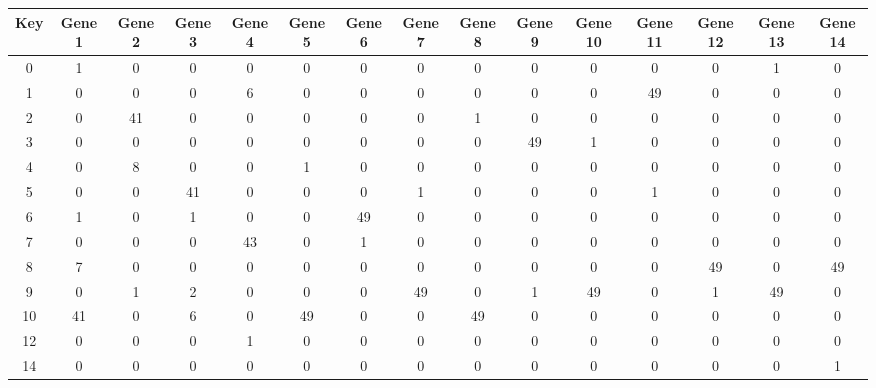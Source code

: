 \begin{tabular}{|c|c|c|c|c|c|c|c|c|c|c|c|c|c|c|}
\hline
Key & Gene 1 & Gene 2 & Gene 3 & Gene 4 & Gene 5 & Gene 6 & Gene 7 & Gene 8 & Gene 9 & Gene 10 & Gene 11 & Gene 12 & Gene 13 & Gene 14 \\
\hline
0 & 1 & 0 & 0 & 0 & 0 & 0 & 0 & 0 & 0 & 0 & 0 & 0 & 1 & 0 \\
1 & 0 & 0 & 0 & 6 & 0 & 0 & 0 & 0 & 0 & 0 & 49 & 0 & 0 & 0 \\
2 & 0 & 41 & 0 & 0 & 0 & 0 & 0 & 1 & 0 & 0 & 0 & 0 & 0 & 0 \\
3 & 0 & 0 & 0 & 0 & 0 & 0 & 0 & 0 & 49 & 1 & 0 & 0 & 0 & 0 \\
4 & 0 & 8 & 0 & 0 & 1 & 0 & 0 & 0 & 0 & 0 & 0 & 0 & 0 & 0 \\
5 & 0 & 0 & 41 & 0 & 0 & 0 & 1 & 0 & 0 & 0 & 1 & 0 & 0 & 0 \\
6 & 1 & 0 & 1 & 0 & 0 & 49 & 0 & 0 & 0 & 0 & 0 & 0 & 0 & 0 \\
7 & 0 & 0 & 0 & 43 & 0 & 1 & 0 & 0 & 0 & 0 & 0 & 0 & 0 & 0 \\
8 & 7 & 0 & 0 & 0 & 0 & 0 & 0 & 0 & 0 & 0 & 0 & 49 & 0 & 49 \\
9 & 0 & 1 & 2 & 0 & 0 & 0 & 49 & 0 & 1 & 49 & 0 & 1 & 49 & 0 \\
10 & 41 & 0 & 6 & 0 & 49 & 0 & 0 & 49 & 0 & 0 & 0 & 0 & 0 & 0 \\
12 & 0 & 0 & 0 & 1 & 0 & 0 & 0 & 0 & 0 & 0 & 0 & 0 & 0 & 0 \\
14 & 0 & 0 & 0 & 0 & 0 & 0 & 0 & 0 & 0 & 0 & 0 & 0 & 0 & 1 \\
\hline
\end{tabular}